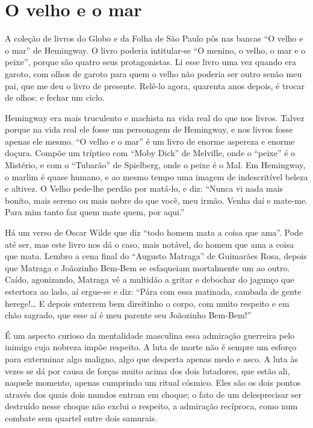 \chapter{O velho e o mar}

A coleção de livros do Globo e da Folha de São Paulo pôs nas bancas “O
velho e o mar” de Hemingway. O livro poderia intitular-se “O menino,
o velho, o mar e o peixe”, porque são quatro seus protagonistas. Li
esse livro uma vez quando era garoto, com olhos de garoto para quem o
velho não poderia ser outro senão meu pai, que me deu o livro de
presente. Relê-lo agora, quarenta anos depois, é trocar de olhos; e
fechar um ciclo.

Hemingway era mais truculento e machista na vida real do que nos
livros. Talvez porque na vida real ele fosse um personagem de
Hemingway, e nos livros fosse apenas ele mesmo. “O velho e o mar” é
um livro de enorme aspereza e enorme doçura. Compõe um tríptico com
“Moby Dick” de Melville, onde o “peixe” é o Mistério, e com o
“Tubarão” de Spielberg, onde o peixe é o Mal. Em Hemingway, o marlim
é quase humano, e ao mesmo tempo uma imagem de indescritível beleza e
altivez.  O Velho pede-lhe perdão por matá-lo, e diz: “Nunca vi nada
mais bonito, mais sereno ou mais nobre do que você, meu irmão. Venha
daí e mate-me. Para mim tanto faz quem mate quem, por aqui.”

Há um verso de Oscar Wilde que diz “todo homem mata a coisa que ama”.
Pode até ser, mas este livro nos dá o caso, mais notável, do homem
que ama a coisa que mata. Lembro a cena final do “Augusto Matraga” de
Guimarães Rosa, depois que Matraga e Joãozinho Bem-Bem se esfaqueiam
mortalmente um ao outro. Caído, agonizando, Matraga vê a multidão a
gritar e debochar do jagunço que estertora ao lado, aí ergue-se e
diz: “Pára com essa matinada, cambada de gente herege!… E depois
enterrem bem direitinho o corpo, com muito respeito e em chão
sagrado, que esse aí é meu parente seu Joãozinho Bem-Bem!”

É um aspecto curioso da mentalidade masculina essa admiração guerreira
pelo inimigo cuja nobreza impõe respeito. A luta de morte não é
sempre um esforço para exterminar algo maligno, algo que desperta
apenas medo e asco. A luta às vezes se dá por causa de forças muito
acima dos dois lutadores, que estão ali, naquele momento, apenas
cumprindo um ritual cósmico. Eles são os dois pontos através dos
quais dois mundos entram em choque; o fato de um delesprecisar ser
destruído nesse choque não exclui o respeito, a admiração recíproca,
como num combate sem quartel entre dois samurais.


